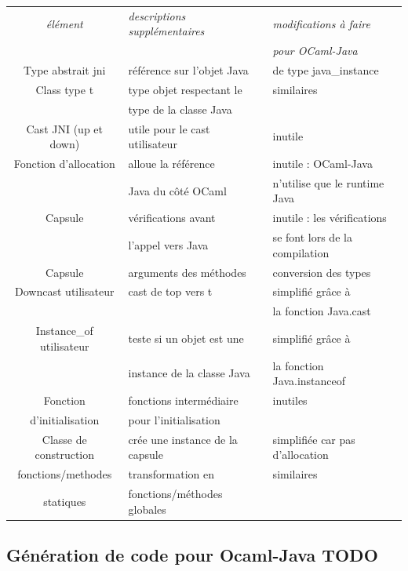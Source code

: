\documentclass[a4paper, 11pt]{article}
\begin{document}
\begin{tabular}{|c|l|l|}
  \hline
  \emph{élément} & \emph{descriptions supplémentaires} & \emph{modifications à faire}\\
  & & \emph{pour OCaml-Java} \\
  \hline
  Type abstrait jni & référence sur l'objet Java & de type java\_instance\\
  \hline
  Class type t & type objet respectant le & similaires\\
  & type de la classe Java & \\
  \hline
  Cast JNI (up et down) & utile pour le cast utilisateur & inutile\\
  \hline
  Fonction d'allocation & alloue la référence & inutile : OCaml-Java \\
  & Java du côté OCaml & n'utilise que le runtime Java\\
  \hline
  Capsule & vérifications avant & inutile : les vérifications \\
&l'appel vers Java & se font lors de la compilation \\
  \hline
  Capsule & arguments des méthodes & conversion des types \\
  \hline
  Downcast utilisateur & cast de top vers t & simplifié grâce à \\
  & & la fonction Java.cast\\
  \hline
  Instance\_of utilisateur & teste si un objet est une & simplifié grâce à \\
  & instance de la classe Java & la fonction Java.instanceof \\
  \hline
  Fonction  & fonctions intermédiaire  & inutiles \\
   d'initialisation &pour l'initialisation & \\
\hline
  Classe de construction & crée une instance de la capsule & simplifiée car pas d'allocation\\
  \hline
  fonctions/methodes& transformation en  & similaires \\
statiques & fonctions/méthodes globales & \\
  \hline
\end{tabular}








\subsection{Génération de code pour Ocaml-Java TODO}
\end{document}
